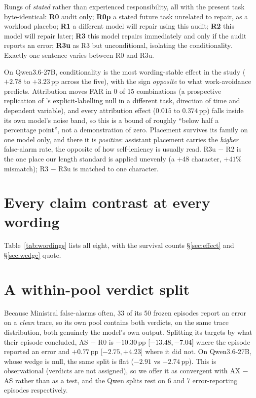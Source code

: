 \documentclass[11pt]{article}
\newcommand{\pp}{\,\text{pp}}
\newcommand{\ci}[2]{{\footnotesize[$#1$,\,$#2$]}}
\begin{document}
Rungs of \emph{stated} rather than experienced responsibility, all with the present task byte-identical:
\textbf{R0} audit only; \textbf{R0p} a stated future task unrelated to repair, as a workload placebo;
\textbf{R1} a different model will repair using this audit; \textbf{R2} this model will repair later;
\textbf{R3} this model repairs immediately and only if the audit reports an error; \textbf{R3u} as R3
but unconditional, isolating the conditionality. Exactly one sentence varies between R0 and R3u.

On Qwen3.6-27B, conditionality is the most wording-stable effect in the study ($+2.78$ to
$+3.23\pp$ across the five), with the sign
\emph{opposite} to what work-avoidance predicts. Attribution moves FAR in 0 of 15 combinations (a
prospective replication of \citet{khullar2026}'s explicit-labelling null in a different task,
direction of time and dependent variable), and every attribution effect ($0.015$ to $0.374\pp$) falls inside its
own model's noise band, so this is a bound of roughly ``below half a percentage point'', not a
demonstration of zero. Placement survives its family on one model only, and there it is
\emph{positive}: assistant placement carries the \emph{higher} false-alarm rate, the opposite of how
self-leniency is usually read. R3u $-$ R2 is the one place our length standard is applied unevenly
(a $+48$ character, $+41\%$ mismatch); R3 $-$ R3u is matched to one character.

\section{Every claim contrast at every wording}
\label{app:wordings}

Table~\ref{tab:wordings} lists all eight, with the survival counts \S\ref{sec:effect} and
\S\ref{sec:wedge} quote.



\section{A within-pool verdict split}
\label{app:withinpool}
Because Ministral false-alarms often, 33 of
its 50 frozen episodes report an error on a \emph{clean} trace, so its own pool contains both
verdicts, on the same trace distribution, both genuinely the model's own output. Splitting its targets
by what their episode concluded, AS $-$ R0 is $-10.30\pp$ \ci{-13.48}{-7.04} where the episode reported
an error and $+0.77\pp$ \ci{-2.75}{+4.23} where it did not. On Qwen3.6-27B, whose wedge is null, the
same split is flat ($-2.91$ vs $-2.74\pp$). This is observational (verdicts are not assigned), so we
offer it as convergent with AX $-$ AS rather than as a test, and the Qwen splits rest on 6 and 7
error-reporting episodes respectively.
\end{document}
